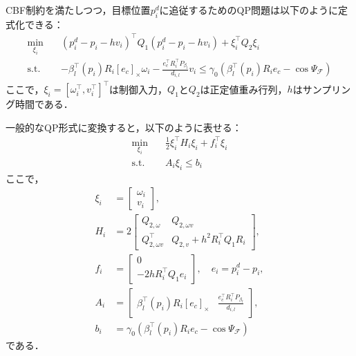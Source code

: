 CBF制約を満たしつつ，目標位置$p_i^d$に追従するためのQP問題は以下のように定式化できる：
\begin{equation}
\begin{aligned}
\min_{\xi_i} \quad & (p^d_i - p_i - hv_i)^\top Q_1 (p^d_i - p_i - hv_i) + \xi_i^\top Q_2 \xi_i \\
\mathrm{s.t.} \quad & -\beta_l^\top(p_i) R_i [e_c]_\times\omega_i - \frac{e_c^\top R_i^\top P_{\beta_l}}{d_{i,l}}v_i \leq \gamma_0 (\beta_l^{\top}(p_i)R_ie_c - \cos\Psi_\mathcal{F})
\label{eq:single_cbf_qp}
\end{aligned}
\end{equation}
ここで，$\xi_i = [\omega_i^\top, v_i^\top]^\top$は制御入力，$Q_1$と$Q_2$は正定値重み行列，$h$はサンプリング時間である．

一般的なQP形式に変換すると，以下のように表せる：
\begin{equation}
\begin{aligned}
\min_{\xi_i} \quad & \frac{1}{2}\xi_i^\top H_i \xi_i + f_i^\top \xi_i \\
\mathrm{s.t.} \quad & A_i \xi_i \leq b_i
\label{eq:single_cbf_qp_standard}
\end{aligned}
\end{equation}
ここで，
\begin{equation}
\begin{aligned}
\xi_i &= \begin{bmatrix} \omega_i \\ v_i \end{bmatrix}, \\
H_i &= 2\begin{bmatrix} Q_{2,\omega} & Q_{2,\omega v} \\ Q_{2,\omega v}^\top & Q_{2,v} + h^2 R_i^\top Q_1 R_i \end{bmatrix}, \\
f_i &= \begin{bmatrix} 0 \\ -2h R_i^\top Q_1 e_i \end{bmatrix}, \quad e_i = p^d_i - p_i, \\
A_i &= \begin{bmatrix} \beta_l^\top(p_i) R_i [e_c]_\times & \frac{e_c^\top R_i^\top P_{\beta_l}}{d_{i,l}} \end{bmatrix}, \\
b_i &= \gamma_0 (\beta_l^{\top}(p_i)R_ie_c - \cos\Psi_\mathcal{F})
\label{eq:single_cbf_qp_params}
\end{aligned}
\end{equation}
である．

